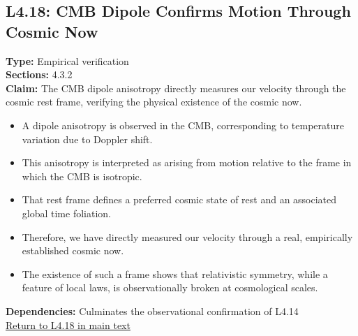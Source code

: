 \documentclass[12pt]{book}
\newcommand{\returnlink}[1]{\hyperref[logic:#1]{Return to #1 in main text}\xspace}
\begin{document}
\subsection*{L4.18: CMB Dipole Confirms Motion Through Cosmic Now}
\label{appendix:L4.18}
\textbf{Type:} Empirical verification \\
\textbf{Sections:} 4.3.2 \\
\textbf{Claim:} The CMB dipole anisotropy directly measures our velocity through the cosmic rest frame, verifying the physical existence of the cosmic now.
\begin{itemize}
  \item A dipole anisotropy is observed in the CMB, corresponding to temperature variation due to Doppler shift.
  \item This anisotropy is interpreted as arising from motion relative to the frame in which the CMB is isotropic.
  \item That rest frame defines a preferred cosmic state of rest and an associated global time foliation.
  \item Therefore, we have directly measured our velocity through a real, empirically established cosmic now.
  \item The existence of such a frame shows that relativistic symmetry, while a feature of local laws, is observationally broken at cosmological scales.
\end{itemize}
\textbf{Dependencies:} Culminates the observational confirmation of L4.14 \\
\returnlink{L4.18}
\end{document}
